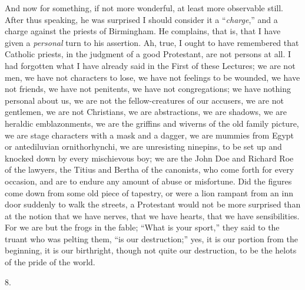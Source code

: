 And now for something, if not more wonderful, at least
more observable still. After thus speaking, he was
surprised I should consider it a ``\emph{charge},''
and a charge against the priests of Birmingham. He
complains, that is, that I have given a \emph{personal}
turn to his assertion. Ah, true, I ought to have
remembered that Catholic priests, in the judgment of a
good Protestant, are not persons at all. I had forgotten
what I have already said in the First of these Lectures;
we are not men, we have not characters to lose, we have
not feelings to be wounded, we have not friends, we have
not penitents, we have not congregations; we have nothing
personal about us, we are not the fellow-creatures of our
accusers, we are not gentlemen, we are not Christians, we
are abstractions, we are shadows, we are heraldic
emblazonments, we are the griffins and wiverns of the old
family picture, we are stage characters with a mask and a
dagger, we are mummies from Egypt or antediluvian
ornithorhynchi, we are unresisting ninepins, to be set up
and knocked down by every mischievous boy; we are the
John Doe and Richard Roe of the lawyers, the Titius and
Bertha of the canonists, who come forth for every
occasion, and are to endure any amount of abuse or
misfortune. Did the figures come down from some old piece
of tapestry, or were a lion rampant from an inn door
suddenly to walk the streets, a Protestant would not be
more surprised than at the notion that we have nerves,
that we have hearts, that we have sensibilities. For we
are but the frogs in the fable; ``What is your
sport,'' they said to the truant who was pelting
them, ``is our destruction;'' yes, it is our
portion from the beginning, it is our birthright, though
not quite our destruction, to be the helots of the pride
of the world.

8.

